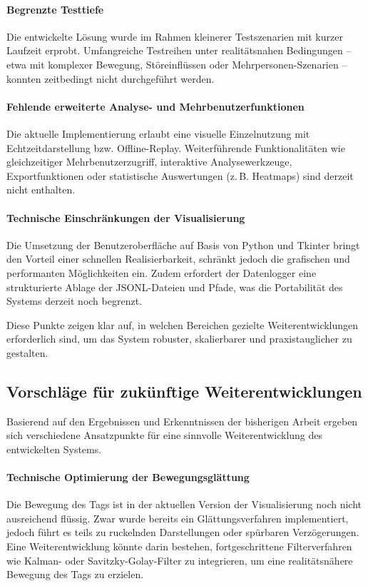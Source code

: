 \documentclass[a4paper, 12pt]{article} %
\begin{document}
\paragraph{Begrenzte Testtiefe}
Die entwickelte Lösung wurde im Rahmen kleinerer Testszenarien mit kurzer Laufzeit erprobt. Umfangreiche Testreihen unter realitätsnahen 
Bedingungen – etwa mit komplexer Bewegung, Störeinflüssen oder Mehrpersonen-Szenarien – konnten zeitbedingt nicht durchgeführt werden.

\paragraph{Fehlende erweiterte Analyse- und Mehrbenutzerfunktionen}
Die aktuelle Implementierung erlaubt eine visuelle Einzelnutzung mit Echtzeitdarstellung bzw. Offline-Replay. Weiterführende Funktionalitäten wie 
gleichzeitiger Mehrbenutzerzugriff, interaktive Analysewerkzeuge, Exportfunktionen oder statistische Auswertungen (z.\,B. Heatmaps) sind derzeit nicht 
enthalten.

\paragraph{Technische Einschränkungen der Visualisierung}
Die Umsetzung der Benutzeroberfläche auf Basis von Python und Tkinter bringt den Vorteil einer schnellen Realisierbarkeit, schränkt jedoch die 
grafischen und performanten Möglichkeiten ein. Zudem erfordert der Datenlogger eine strukturierte Ablage der JSONL-Dateien und Pfade, was die 
Portabilität des Systems derzeit noch begrenzt.

Diese Punkte zeigen klar auf, in welchen Bereichen gezielte Weiterentwicklungen erforderlich sind, um das System robuster, skalierbarer und 
praxistauglicher zu gestalten.

\subsection{Vorschläge für zukünftige Weiterentwicklungen}

Basierend auf den Ergebnissen und Erkenntnissen der bisherigen Arbeit ergeben sich verschiedene Ansatzpunkte für eine sinnvolle Weiterentwicklung
 des entwickelten Systems.

\paragraph{Technische Optimierung der Bewegungsglättung}
Die Bewegung des Tags ist in der aktuellen Version der Visualisierung noch nicht ausreichend flüssig. Zwar wurde bereits ein Glättungsverfahren 
implementiert, jedoch führt es teils zu ruckelnden Darstellungen oder spürbaren Verzögerungen. Eine Weiterentwicklung könnte darin bestehen, 
fortgeschrittene Filterverfahren wie Kalman- oder Savitzky-Golay-Filter zu integrieren, um eine realitätsnähere Bewegung des Tags zu erzielen.
\end{document}
